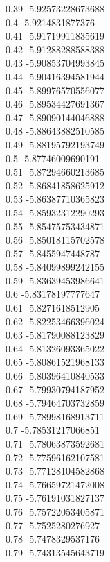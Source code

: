 {0.39	-5.92573228673688\\
0.4	-5.9214831877376\\
0.41	-5.91719911835619\\
0.42	-5.91288288588388\\
0.43	-5.90853704993845\\
0.44	-5.90416394581944\\
0.45	-5.89976570556077\\
0.46	-5.89534427691367\\
0.47	-5.89090144046888\\
0.48	-5.88643882510585\\
0.49	-5.88195792193749\\
0.5	-5.87746009690191\\
0.51	-5.87294660213685\\
0.52	-5.86841858625912\\
0.53	-5.86387710365823\\
0.54	-5.85932312290293\\
0.55	-5.85475753434871\\
0.56	-5.85018115702578\\
0.57	-5.8455947448787\\
0.58	-5.84099899242155\\
0.59	-5.83639453986641\\
0.6	-5.83178197777647\\
0.61	-5.8271618512905\\
0.62	-5.82253466396024\\
0.63	-5.81790088123829\\
0.64	-5.81326093365022\\
0.65	-5.80861521968133\\
0.66	-5.80396410840533\\
0.67	-5.79930794187952\\
0.68	-5.79464703732859\\
0.69	-5.78998168913711\\
0.7	-5.78531217066851\\
0.71	-5.78063873592681\\
0.72	-5.77596162107581\\
0.73	-5.77128104582868\\
0.74	-5.76659721472008\\
0.75	-5.76191031827137\\
0.76	-5.75722053405871\\
0.77	-5.7525280276927\\
0.78	-5.7478329537176\\
0.79	-5.74313545643719\\
}

